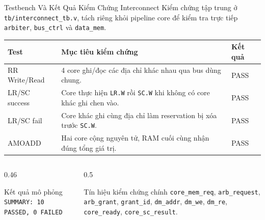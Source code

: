 \begin{frame}{Testbench Và Kết Quả Kiểm Chứng Interconnect}
    \small
    Kiểm chứng tập trung ở \texttt{tb/interconnect\_tb.v}, tách riêng khỏi pipeline core để kiểm tra trực tiếp \texttt{arbiter}, \texttt{bus\_ctrl} và \texttt{data\_mem}.

    \vspace{0.12cm}
    \begin{table}
        \centering
        \scriptsize
        \begin{tabular}{p{2.6cm} p{5.1cm} p{2.4cm}}
            \toprule
            \textbf{Test} & \textbf{Mục tiêu kiểm chứng} & \textbf{Kết quả} \\
            \midrule
            RR Write/Read & 4 core ghi/đọc các địa chỉ khác nhau qua bus dùng chung. & PASS \\
            LR/SC success & Core thực hiện \texttt{LR.W} rồi \texttt{SC.W} khi không có core khác ghi chen vào. & PASS \\
            LR/SC fail & Core khác ghi cùng địa chỉ làm reservation bị xóa trước \texttt{SC.W}. & PASS \\
            AMOADD & Hai core cộng nguyên tử, RAM cuối cùng nhận đúng tổng giá trị. & PASS \\
            \bottomrule
        \end{tabular}
    \end{table}

    \vspace{-0.05cm}
    \begin{columns}[T]
        \begin{column}{0.46\textwidth}
            \begin{alertblock}{Kết quả mô phỏng}
                \centering
                \texttt{SUMMARY: 10 PASSED, 0 FAILED}
            \end{alertblock}
        \end{column}
        \begin{column}{0.5\textwidth}
            \begin{block}{Tín hiệu kiểm chứng chính}
                \scriptsize
                \texttt{core\_mem\_req}, \texttt{arb\_request}, \texttt{arb\_grant}, \texttt{grant\_id}, \texttt{dm\_addr}, \texttt{dm\_we}, \texttt{dm\_re}, \texttt{core\_ready}, \texttt{core\_sc\_result}.
            \end{block}
        \end{column}
    \end{columns}
\end{frame}

